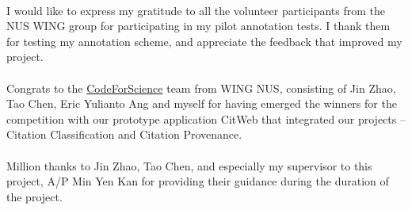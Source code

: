 \documentclass[hyp, 12pt]{socreport}
\begin{document}
\begin{acknowledgement}
\paragraph{}
I would like to express my gratitude to all the volunteer participants from the NUS WING group for participating in my pilot annotation tests. I thank them for testing my annotation scheme, and appreciate the feedback that improved my project.

\paragraph{}
Congrats to the \url{CodeForScience} team from WING NUS, consisting of Jin Zhao, Tao Chen, Eric Yulianto Ang and myself for having emerged the winners for the competition with our prototype application CitWeb that integrated our projects -- Citation Classification and Citation Provenance.

\paragraph{}
Million thanks to Jin Zhao, Tao Chen, and especially my supervisor to this project, A/P Min Yen Kan for providing their guidance during the duration of the project.
\end{acknowledgement}

\listoffigures
\listoftables
\tableofcontents







 



\appendix

\end{document}
